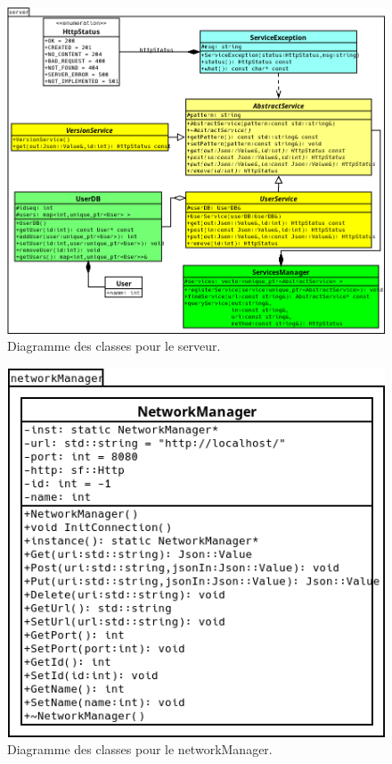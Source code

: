 \begin{figure}[p]
\centering
\includegraphics[width=0.6\paperheight]{images/server.png}
\caption{\label{uml:server}Diagramme des classes pour le serveur.} 
\end{figure}

\begin{figure}[p]
\centering
\includegraphics[width=0.4\paperheight]{images/networkManager.png}
\caption{\label{uml:networkManager}Diagramme des classes pour le networkManager.} 
\end{figure}
%
